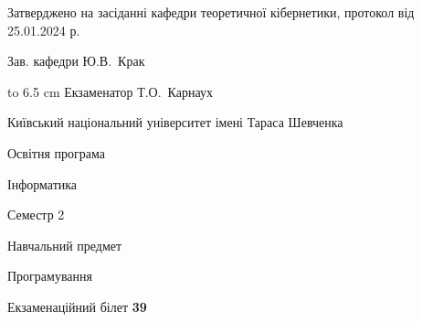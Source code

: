 \documentclass[12pt, ukrainian]{article}
\begin{document}
{\smallskip\smallskip \begin {scriptsize} Затверджено на засіданні кафедри теоретичної кібернетики, протокол   від   25.01.2024 р.\par\smallskip\smallskip\smallskip\smallskip
{\parbox {6.5 cm} {Зав. кафедри \dotfill Ю.В.~Крак}}\hspace {0.7cm} {\hbox to 6.5 cm { Екзаменатор \dotfill Т.О.~Карнаух}} \end{scriptsize}}
\newpage
{{\begin {scriptsize}\par
{ \center  Київський національний університет імені Тараса Шевченка \par}
{\parbox {5 cm}{Освітня програма \hfill}{\parbox {7 cm}{Інформатика\hfill}}\parbox {6 cm}{\hfill Семестр 2}}\par
{\parbox {5 cm} {Навчальний предмет \hfill}\parbox {7 cm}{Програмування \hfill}\parbox {6cm}{\hfill}\par}\vspace{-15pt} \end{scriptsize}}{\center Екзаменаційний білет \No \textbf { 39 }\par}}
\end{document}
